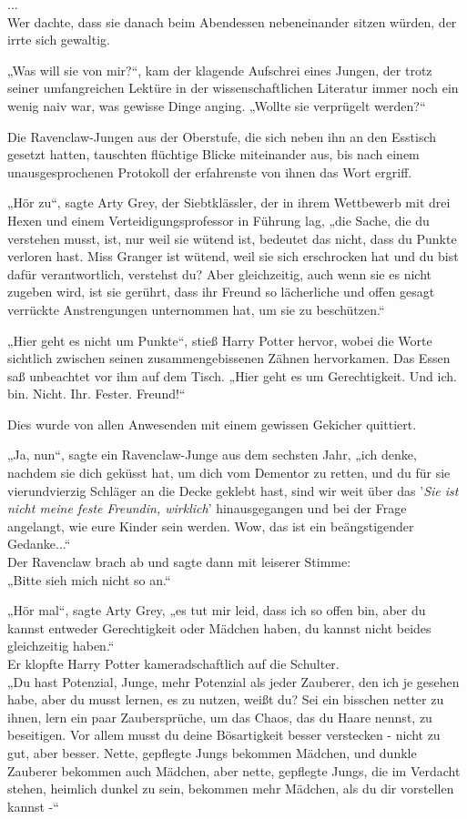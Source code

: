 {...\\ Wer dachte, dass sie danach beim Abendessen nebeneinander sitzen würden, der irrte sich gewaltig.

„Was will sie von mir?“, kam der klagende Aufschrei eines Jungen, der trotz seiner umfangreichen Lektüre in der wissenschaftlichen Literatur immer noch ein wenig naiv war, was gewisse Dinge anging. „Wollte sie verprügelt werden?“

Die Ravenclaw-Jungen aus der Oberstufe, die sich neben ihn an den Esstisch gesetzt hatten, tauschten flüchtige Blicke miteinander aus, bis nach einem unausgesprochenen Protokoll der erfahrenste von ihnen das Wort ergriff.

„Hör zu“, sagte Arty Grey, der Siebtklässler, der in ihrem Wettbewerb mit drei Hexen und einem Verteidigungsprofessor in Führung lag, „die Sache, die du verstehen musst, ist, nur weil sie wütend ist, bedeutet das nicht, dass du Punkte verloren hast. Miss Granger ist wütend, weil sie sich erschrocken hat und du bist dafür verantwortlich, verstehst du? Aber gleichzeitig, auch wenn sie es nicht zugeben wird, ist sie gerührt, dass ihr Freund so lächerliche und offen gesagt verrückte Anstrengungen unternommen hat, um sie zu beschützen.“

„Hier geht es nicht um Punkte“, stieß Harry Potter hervor, wobei die Worte sichtlich zwischen seinen zusammengebissenen Zähnen hervorkamen. Das Essen saß unbeachtet vor ihm auf dem Tisch. „Hier geht es um Gerechtigkeit. Und ich. bin. Nicht. Ihr. Fester. Freund!“

Dies wurde von allen Anwesenden mit einem gewissen Gekicher quittiert.

„Ja, nun“, sagte ein Ravenclaw-Junge aus dem sechsten Jahr, „ich denke, nachdem sie dich geküsst hat, um dich vom Dementor zu retten, und du für sie vierundvierzig Schläger an die Decke geklebt hast, sind wir weit über das '\emph{Sie ist nicht meine feste Freundin, wirklich}' hinausgegangen und bei der Frage angelangt, wie eure Kinder sein werden. Wow, das ist ein beängstigender Gedanke...“\\ Der Ravenclaw brach ab und sagte dann mit leiserer Stimme:\\ „Bitte sieh mich nicht so an.“

„Hör mal“, sagte Arty Grey, „es tut mir leid, dass ich so offen bin, aber du kannst entweder Gerechtigkeit oder Mädchen haben, du kannst nicht beides gleichzeitig haben.“\\ Er klopfte Harry Potter kameradschaftlich auf die Schulter.\\ „Du hast Potenzial, Junge, mehr Potenzial als jeder Zauberer, den ich je gesehen habe, aber du musst lernen, es zu nutzen, weißt du? Sei ein bisschen netter zu ihnen, lern ein paar Zaubersprüche, um das Chaos, das du Haare nennst, zu beseitigen. Vor allem musst du deine Bösartigkeit besser verstecken - nicht zu gut, aber besser. Nette, gepflegte Jungs bekommen Mädchen, und dunkle Zauberer bekommen auch Mädchen, aber nette, gepflegte Jungs, die im Verdacht stehen, heimlich dunkel zu sein, bekommen mehr Mädchen, als du dir vorstellen kannst -“

}
